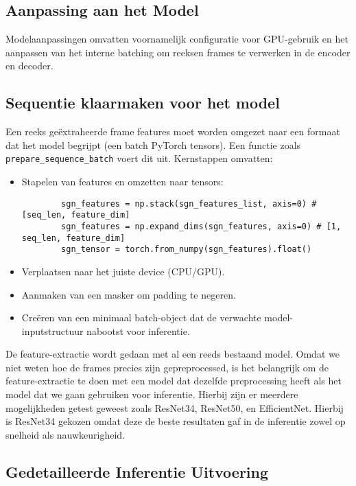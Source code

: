\subsection{Aanpassing aan het Model}
\label{sec:aanpassing-model-latex}

Modelaanpassingen omvatten voornamelijk configuratie voor GPU-gebruik en het aanpassen van het interne batching om reeksen frames te verwerken in de encoder en decoder.

\subsection{Sequentie klaarmaken voor het model}
\label{sec:sequentie-klaarmaken-latex}

Een reeks geëxtraheerde frame features moet worden omgezet naar een formaat dat het model begrijpt (een batch PyTorch tensors).
Een functie zoals \texttt{prepare\_sequence\_batch} voert dit uit. 
Kernstappen omvatten:
\begin{itemize}
    \item Stapelen van features en omzetten naar tensors:
    \begin{lstlisting}
        sgn_features = np.stack(sgn_features_list, axis=0) # [seq_len, feature_dim]
        sgn_features = np.expand_dims(sgn_features, axis=0) # [1, seq_len, feature_dim]
        sgn_tensor = torch.from_numpy(sgn_features).float()
    \end{lstlisting}
    \item Verplaatsen naar het juiste device (CPU/GPU).
    \item Aanmaken van een masker om padding te negeren.
    \item Creëren van een minimaal batch-object dat de verwachte model-inputstructuur nabootst voor inferentie.
\end{itemize}

De feature-extractie wordt gedaan met al een reeds bestaand model.
Omdat we niet weten hoe de frames precies zijn gepreprocessed, is het belangrijk om de feature-extractie te doen met een model dat dezelfde preprocessing heeft als het model dat we gaan gebruiken voor inferentie.
Hierbij zijn er meerdere mogelijkheden getest geweest zoals ResNet34, ResNet50, en EfficientNet.
Hierbij is ResNet34 gekozen omdat deze de beste resultaten gaf in de inferentie zowel op snelheid als nauwkeurigheid. 

\subsection{Gedetailleerde Inferentie Uitvoering}
\label{sec:gedetailleerde-inferentie}

